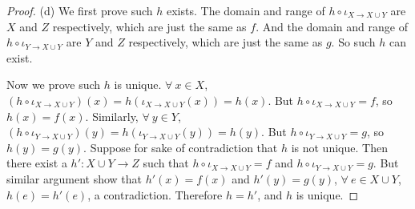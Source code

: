 \begin{proof}{(d)}
We first prove such \(h\) exists.
The domain and range of \(h \circ \iota_{X \to X \cup Y}\) are \(X\) and \(Z\) respectively, which are just the same as \(f\).
And the domain and range of \(h \circ \iota_{Y \to X \cup Y}\) are \(Y\) and \(Z\) respectively, which are just the same as \(g\).
So such \(h\) can exist.

Now we prove such \(h\) is unique.
\(\forall\ x \in X\), \((h \circ \iota_{X \to X \cup Y})(x) = h(\iota_{X \to X \cup Y}(x)) = h(x)\).
But \(h \circ \iota_{X \to X \cup Y} = f\), so \(h(x) = f(x)\).
Similarly, \(\forall\ y \in Y\), \((h \circ \iota_{Y \to X \cup Y})(y) = h(\iota_{Y \to X \cup Y}(y)) = h(y)\).
But \(h \circ \iota_{Y \to X \cup Y} = g\), so \(h(y) = g(y)\).
Suppose for sake of contradiction that \(h\) is not unique.
Then there exist a \(h': X \cup Y \to Z\) such that \(h \circ \iota_{X \to X \cup Y} = f\) and \(h \circ \iota_{Y \to X \cup Y} = g\).
But similar argument show that \(h'(x) = f(x)\) and \(h'(y) = g(y)\), \(\forall\ e \in X \cup Y\), \(h(e) = h'(e)\), a contradiction.
Therefore \(h = h'\), and \(h\) is unique.
\end{proof}